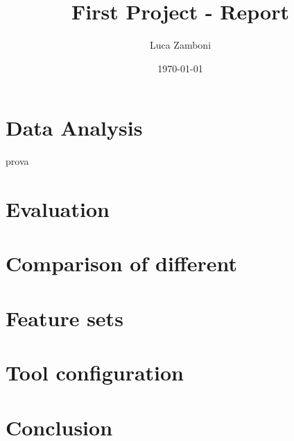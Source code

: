 \documentclass[a4paper,8pt,oneside]{book}
\author{Luca Zamboni}
\title{\vspace{-4em} \LARGE First Project - Report}
\date{\today}
\begin{document}




\frontmatter
\tableofcontents

\mainmatter

\section{Data Analysis}
	prova

\section{Evaluation}

\section{Comparison of different}

\section{Feature sets}

\section{Tool configuration}

\section{Conclusion}

% 
% 
\end{document}
